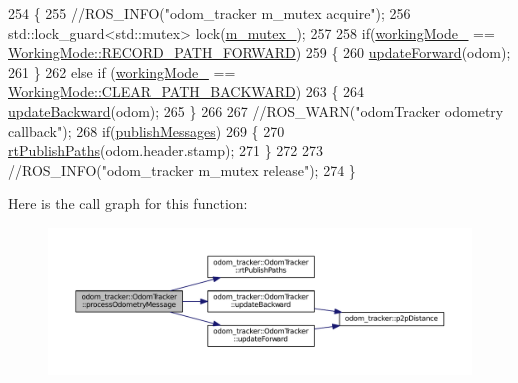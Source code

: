 \begin{DoxyCode}
254 \{
255     \textcolor{comment}{//ROS\_INFO("odom\_tracker m\_mutex acquire");}
256     std::lock\_guard<std::mutex> lock(\hyperlink{classodom__tracker_1_1OdomTracker_a17f1d82ae3d6441a4387af8fb83a3e20}{m\_mutex\_});
257 
258     \textcolor{keywordflow}{if}(\hyperlink{classodom__tracker_1_1OdomTracker_ab3b29200405d9a88cf3213656b14d7c0}{workingMode\_} == \hyperlink{namespaceodom__tracker_a4daf27fd157b1a481fdfd6f90de00b88a989d06a586bcf9520889228da7faa643}{WorkingMode::RECORD\_PATH\_FORWARD})
259     \{
260         \hyperlink{classodom__tracker_1_1OdomTracker_a248c89552c36c6df65a0d3b9aa58cce6}{updateForward}(odom);
261     \}       
262     \textcolor{keywordflow}{else} \textcolor{keywordflow}{if} (\hyperlink{classodom__tracker_1_1OdomTracker_ab3b29200405d9a88cf3213656b14d7c0}{workingMode\_} == \hyperlink{namespaceodom__tracker_a4daf27fd157b1a481fdfd6f90de00b88a0cf8f27617189e35619df3c18bda6274}{WorkingMode::CLEAR\_PATH\_BACKWARD})
263     \{
264         \hyperlink{classodom__tracker_1_1OdomTracker_a30bb3d4a44600ce951a6be4f6583466c}{updateBackward}(odom);
265     \}
266 
267     \textcolor{comment}{//ROS\_WARN("odomTracker odometry callback");}
268     \textcolor{keywordflow}{if}(\hyperlink{classodom__tracker_1_1OdomTracker_a4d617a7bc17a7880a5ebee9697f827c0}{publishMessages})
269     \{
270         \hyperlink{classodom__tracker_1_1OdomTracker_ade06ab05e1853fbccd3702f88f0a42e5}{rtPublishPaths}(odom.header.stamp);
271     \}
272 
273     \textcolor{comment}{//ROS\_INFO("odom\_tracker m\_mutex release");}
274 \}
\end{DoxyCode}


Here is the call graph for this function\+:
\nopagebreak
\begin{figure}[H]
\begin{center}
\leavevmode
\includegraphics[width=350pt]{classodom__tracker_1_1OdomTracker_a90cf5e7b0de712b88e86966c29ab79ef_cgraph}
\end{center}
\end{figure}




